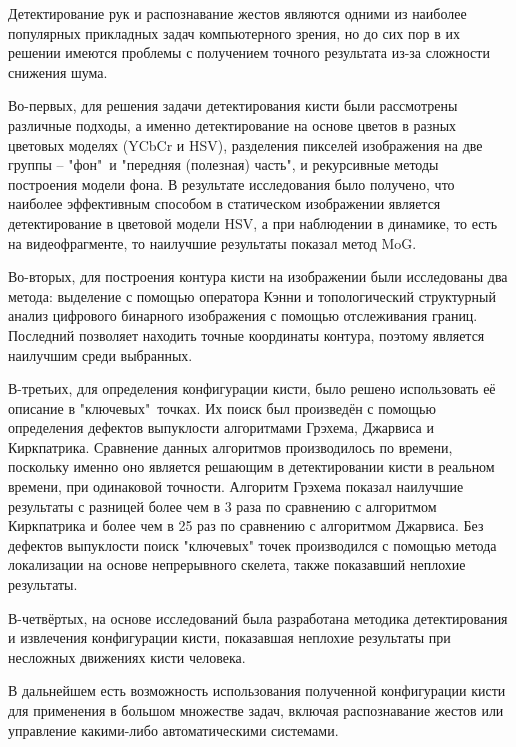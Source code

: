
Детектирование рук и распознавание жестов являются одними из
наиболее популярных прикладных задач компьютерного зрения, но
до сих пор в их решении имеются проблемы с получением точного
результата из-за сложности снижения шума. 

Во-первых, для решения задачи детектирования кисти
были рассмотрены различные подходы, а именно детектирование
на основе цветов в разных цветовых моделях (YCbCr и HSV),
разделения пикселей изображения на две группы -- "фон"\ и
"передняя (полезная) часть", и рекурсивные методы
построения модели фона. В результате исследования было получено,
что наиболее эффективным способом в статическом изображении
является детектирование в цветовой модели HSV, а при 
наблюдении в динамике, то есть на видеофрагменте, то 
наилучшие результаты показал метод MoG. 

Во-вторых, для построения контура кисти на изображении были
исследованы два метода: выделение с помощью оператора Кэнни и 
топологический структурный анализ цифрового бинарного
изображения с помощью отслеживания границ. Последний позволяет
находить точные координаты контура, поэтому является наилучшим
среди выбранных.
 
В-третьих, для определения конфигурации кисти, было решено 
использовать её описание в "ключевых"\ точках. Их поиск был
произведён с помощью определения дефектов выпуклости алгоритмами
Грэхема, Джарвиса и Киркпатрика. Сравнение данных алгоритмов
производилось по времени, поскольку именно оно является решающим
в детектировании кисти в реальном времени, при одинаковой точности.
Алгоритм Грэхема показал наилучшие результаты с разницей
более чем в 3 раза по сравнению с алгоритмом Киркпатрика и более
чем в 25 раз по сравнению с алгоритмом Джарвиса. Без дефектов
выпуклости поиск
"ключевых" точек производился с помощью метода локализации на основе
непрерывного скелета, также показавший неплохие результаты.

В-четвёртых, на основе исследований была разработана методика
детектирования и извлечения конфигурации кисти, показавшая
неплохие результаты при несложных движениях кисти человека.

В дальнейшем есть возможность использования полученной конфигурации
кисти для применения в большом множестве задач, включая
распознавание жестов или управление какими-либо автоматическими
системами.
